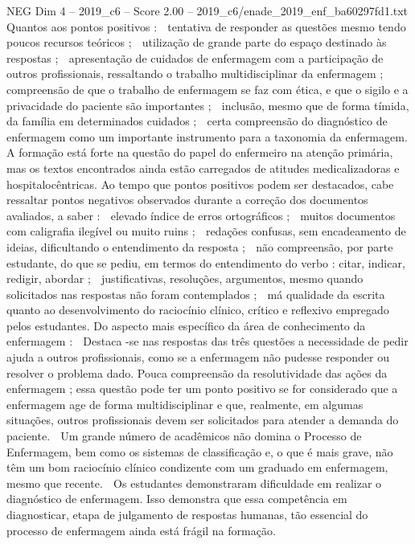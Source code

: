 \begin{textsample}{NEG Dim 4 – 2019\_c6 – Score 2.00 – 2019\_c6/enade\_2019\_enf\_ba60297fd1.txt}
Quantos aos pontos positivos :  tentativa de responder as questões mesmo tendo poucos recursos teóricos ;  utilização de grande parte do espaço destinado às respostas ;  apresentação de cuidados de enfermagem com a participação de outros profissionais, ressaltando o trabalho multidisciplinar da enfermagem ;  compreensão de que o trabalho de enfermagem se faz com ética, e que o sigilo e a privacidade do paciente são importantes ;  inclusão, mesmo que de forma tímida, da família em determinados cuidados ;  certa compreensão do diagnóstico de enfermagem como um importante instrumento para a taxonomia da enfermagem.
A formação está forte na questão do papel do enfermeiro na atenção primária, mas os textos encontrados ainda estão carregados de atitudes medicalizadoras e hospitalocêntricas.
Ao tempo que pontos positivos podem ser destacados, cabe ressaltar pontos negativos observados durante a correção dos documentos avaliados, a saber :  elevado índice de erros ortográficos ;  muitos documentos com caligrafia ilegível ou muito ruins ;  redações confusas, sem encadeamento de ideias, dificultando o entendimento da resposta ;  não compreensão, por parte estudante, do que se pediu, em termos do entendimento do verbo : citar, indicar, redigir, abordar ;  justificativas, resoluções, argumentos, mesmo quando solicitados nas respostas não foram contemplados ;  má qualidade da escrita quanto ao desenvolvimento do raciocínio clínico, crítico e reflexivo empregado pelos estudantes.
Do aspecto mais específico da área de conhecimento da enfermagem :  Destaca -se nas respostas das três questões a necessidade de pedir ajuda a outros profissionais, como se a enfermagem não pudesse responder ou resolver o problema dado.
Pouca compreensão da resolutividade das ações da enfermagem ; essa questão pode ter um ponto positivo se for considerado que a enfermagem age de forma multidisciplinar e que, realmente, em algumas situações, outros profissionais devem ser solicitados para atender a demanda do paciente.  Um grande número de acadêmicos não domina o Processo de Enfermagem, bem como os sistemas de classificação e, o que é mais grave, não têm um bom raciocínio clínico condizente com um graduado em enfermagem, mesmo que recente.  Os estudantes demonstraram dificuldade em realizar o diagnóstico de enfermagem.
Isso demonstra que essa competência em diagnosticar, etapa de julgamento de respostas humanas, tão essencial do processo de enfermagem ainda está frágil na formação.

\end{textsample}
